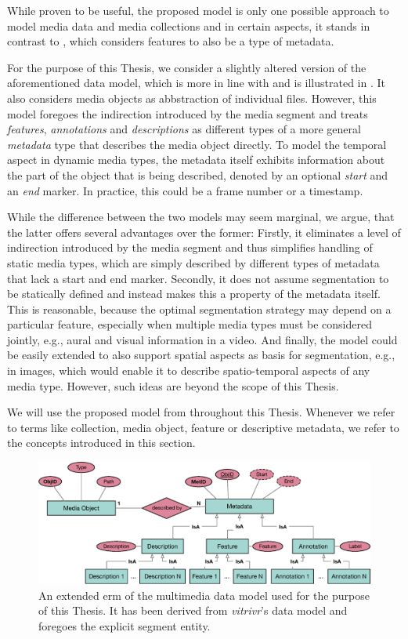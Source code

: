 While proven to be useful, the proposed model is only one possible approach to model media data and media collections and in  certain aspects, it stands in contrast to \cite{Blanken:2007multimedia}, which considers features to also be a type of metadata. 

For the purpose of this Thesis, we consider a slightly altered version of the aforementioned data model, which is more in line with \cite{Blanken:2007multimedia} and is illustrated in . It also considers media objects as abbstraction of individual files. However, this model foregoes the indirection introduced by the media segment and treats \emph{features}, \emph{annotations} and \emph{descriptions} as different types of a more general \emph{metadata} type that describes the media object directly. To model the temporal aspect in dynamic media types, the metadata itself exhibits information about the part of the object that is being described, denoted by an optional \emph{start} and an \emph{end} marker. In practice, this could be a frame number or a timestamp.

While the difference between the two models may seem marginal, we argue, that the latter offers several advantages over the former: Firstly, it eliminates a level of indirection introduced by the media segment and thus simplifies handling of static media types, which are simply described by different types of metadata that lack a start and end marker. Secondly, it does not assume segmentation to be statically defined and instead makes this a property of the metadata itself. This is reasonable, because the optimal segmentation strategy may depend on a particular feature, especially when multiple media types must be considered jointly, e.g., aural and visual information in a video. And finally, the model could be easily extended to also support spatial aspects as basis for segmentation, e.g., in images, which would enable it to describe spatio-temporal aspects of any media type. However, such ideas are beyond the scope of this Thesis. 

We will use the proposed model from  throughout this Thesis. Whenever we refer to terms like collection, media object, feature or descriptive metadata, we refer to the concepts introduced in this section.

\begin{figure}[bt]
    \centering
    \includegraphics[width=\textwidth]{figures/erm-media-data}
    \caption{An extended \acrshort{erm} of the multimedia data model used for the purpose of this Thesis. It has been derived from \emph{vitrivr}'s data model and foregoes the explicit segment entity.}
    \label{figure:erm_mediadata}
\end{figure}

